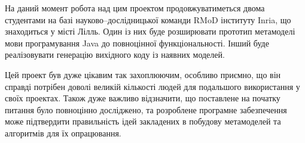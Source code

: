 \documentclass[12pt,a4paper]{article}
\begin{document}
На даний момент робота над цим проектом продовжуватиметься двома студентами на базі науково--дослідницької команди RMoD інституту Inria, що знаходиться у місті Лілль. Один із них буде розширювати прототип метамоделі мови програмування Java до повноцінної функціональності. Інший буде реалізовувати генерацію вихідного коду із наявних моделей.

Цей проект був дуже цікавим так захоплюючим, особливо приємно, що він справді потрібен доволі великій кількості людей для подальшого використання у своїх проектах. Також дуже важливо відзначити, що поставлене на початку питання було повноцінно досліджено, та розроблене програмне забезпечення може підтвердити правильність ідей закладених в побудову метамоделей та алгоритмів для їх опрацювання.

\clearpage
\end{document}
